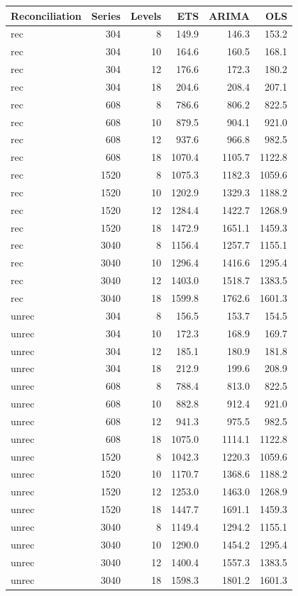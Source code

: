 \documentclass[11pt,a4paper,]{article}
\let\origtable\table
\let\endorigtable\endtable
\renewenvironment{table}[1][2] {
    \expandafter\origtable\expandafter[!htbp]
} {
    \endorigtable
}
\begin{document}
\begin{table}[!h]

\caption{\label{tab:TourismdatasimrollinglevelNS}Mean RMSE by number of hierarchy levels, number of bottom-level series, method, with/without reconciliation. Simulated series has error value 0.5. Forecasting uses rolling origin for a 24-month horizon.}
\centering
\begin{tabular}[t]{lrrrrr}
\toprule
Reconciliation & Series & Levels & ETS & ARIMA & OLS\\
\midrule
rec & 304 & 8 & 149.9 & 146.3 & 153.2\\
rec & 304 & 10 & 164.6 & 160.5 & 168.1\\
rec & 304 & 12 & 176.6 & 172.3 & 180.2\\
rec & 304 & 18 & 204.6 & 208.4 & 207.1\\
rec & 608 & 8 & 786.6 & 806.2 & 822.5\\
rec & 608 & 10 & 879.5 & 904.1 & 921.0\\
rec & 608 & 12 & 937.6 & 966.8 & 982.5\\
rec & 608 & 18 & 1070.4 & 1105.7 & 1122.8\\
rec & 1520 & 8 & 1075.3 & 1182.3 & 1059.6\\
rec & 1520 & 10 & 1202.9 & 1329.3 & 1188.2\\
rec & 1520 & 12 & 1284.4 & 1422.7 & 1268.9\\
rec & 1520 & 18 & 1472.9 & 1651.1 & 1459.3\\
rec & 3040 & 8 & 1156.4 & 1257.7 & 1155.1\\
rec & 3040 & 10 & 1296.4 & 1416.6 & 1295.4\\
rec & 3040 & 12 & 1403.0 & 1518.7 & 1383.5\\
rec & 3040 & 18 & 1599.8 & 1762.6 & 1601.3\\
unrec & 304 & 8 & 156.5 & 153.7 & 154.5\\
unrec & 304 & 10 & 172.3 & 168.9 & 169.7\\
unrec & 304 & 12 & 185.1 & 180.9 & 181.8\\
unrec & 304 & 18 & 212.9 & 199.6 & 208.9\\
unrec & 608 & 8 & 788.4 & 813.0 & 822.5\\
unrec & 608 & 10 & 882.8 & 912.4 & 921.0\\
unrec & 608 & 12 & 941.3 & 975.5 & 982.5\\
unrec & 608 & 18 & 1075.0 & 1114.1 & 1122.8\\
unrec & 1520 & 8 & 1042.3 & 1220.3 & 1059.6\\
unrec & 1520 & 10 & 1170.7 & 1368.6 & 1188.2\\
unrec & 1520 & 12 & 1253.0 & 1463.0 & 1268.9\\
unrec & 1520 & 18 & 1447.7 & 1691.1 & 1459.3\\
unrec & 3040 & 8 & 1149.4 & 1294.2 & 1155.1\\
unrec & 3040 & 10 & 1290.0 & 1454.2 & 1295.4\\
unrec & 3040 & 12 & 1400.4 & 1557.3 & 1383.5\\
unrec & 3040 & 18 & 1598.3 & 1801.2 & 1601.3\\
\bottomrule
\end{tabular}
\end{table}
\end{document}
